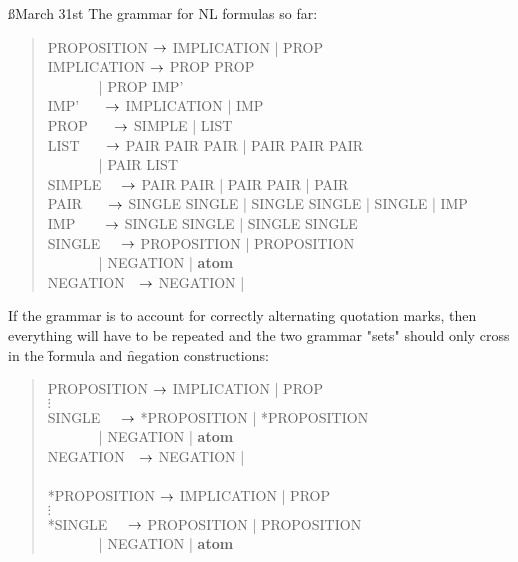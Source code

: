 \documentclass[a4paper]{article}
\begin{document}
\ss{March 31st}
The grammar for NL formulas so far:
\begin{quote}
\ttfamily
PROPOSITION $\rightarrow$ IMPLICATION | PROP\\
IMPLICATION $\rightarrow$  PROP  PROP\\
\(~~~~~~~~~~~~~~~\) |
 PROP  IMP'\\
IMP' \(~~~~~~~\)$\rightarrow$ IMPLICATION | IMP \\
PROP \(~~~~~~~\)$\rightarrow$ SIMPLE | LIST \\
LIST \(~~~~~~~\)$\rightarrow$ PAIR\txt{, } PAIR PAIR |
                      PAIR\txt{, } PAIR PAIR\\
\(~~~~~~~~~~~~~~~\) | PAIR\txt{, } LIST\\
SIMPLE \(~~~~~\)$\rightarrow$ PAIR  PAIR |
                      PAIR  PAIR  | PAIR\\
PAIR \(~~~~~~~\)$\rightarrow$ SINGLE   SINGLE | SINGLE  SINGLE
                    | SINGLE | IMP\\
IMP \(~~~~~~~~\)$\rightarrow$ SINGLE  SINGLE
                    | SINGLE  SINGLE\\
SINGLE \(~~~~~\)$\rightarrow$ PROPOSITION |
                      PROPOSITION\\
\(~~~~~~~~~~~~~~~\) | NEGATION | {\bf atom}\\
NEGATION \(~~~\)$\rightarrow$ NEGATION | \\
\end{quote}

If the grammar is to account for correctly alternating quotation marks,
then everything will have to be repeated and the two grammar "sets" should
only cross in the \f{formula} and \f{negation} constructions:
\begin{quote}
\ttfamily
PROPOSITION $\rightarrow$ IMPLICATION | PROP\\
$\vdots$\\
SINGLE \(~~~~~\)$\rightarrow$ *PROPOSITION |
                      *PROPOSITION\\
\(~~~~~~~~~~~~~~~\) | NEGATION | {\bf atom}\\
NEGATION \(~~~\)$\rightarrow$ NEGATION | \\
~\\
*PROPOSITION $\rightarrow$ IMPLICATION | PROP\\
$\vdots$\\
*SINGLE \(~~~~~\)$\rightarrow$ PROPOSITION |
                      PROPOSITION\\
\(~~~~~~~~~~~~~~~\) | NEGATION | {\bf atom}\\
\end{quote}
\end{document}
